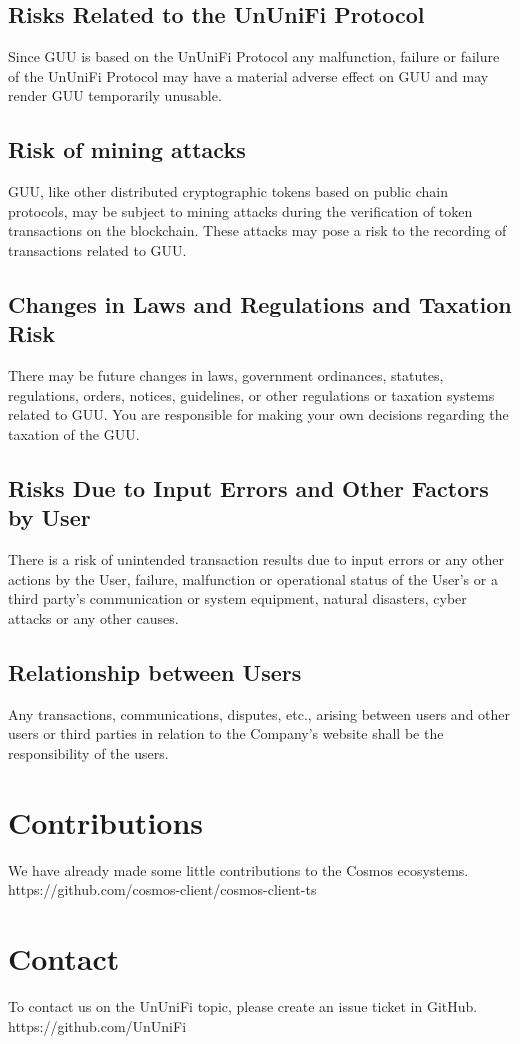 \documentclass[dvipdfmx]{jsarticle}
\begin{document}
\subsection{Risks Related to the UnUniFi Protocol}
Since GUU is based on the UnUniFi Protocol any malfunction, failure or failure of the UnUniFi Protocol may have a material adverse effect on GUU and may render GUU temporarily unusable.

\subsection{Risk of mining attacks}
GUU, like other distributed cryptographic tokens based on public chain protocols, may be subject to mining attacks during the verification of token transactions on the blockchain. 
These attacks may pose a risk to the recording of transactions related to GUU.

\subsection{Changes in Laws and Regulations and Taxation Risk}
There may be future changes in laws, government ordinances, statutes, regulations, orders, notices, guidelines, or other regulations or taxation systems related to GUU. 
You are responsible for making your own decisions regarding the taxation of the GUU. 

\subsection{Risks Due to Input Errors and Other Factors by User}
There is a risk of unintended transaction results due to input errors or any other actions by the User, failure, malfunction or operational status of the User's or a third party's communication or system equipment, natural disasters, cyber attacks or any other causes. 

\subsection{Relationship between Users}
Any transactions, communications, disputes, etc., arising between users and other users or third parties in relation to the Company's website shall be the responsibility of the users. 

\section{Contributions}
We have already made some little contributions to the Cosmos ecosystems. \\
https://github.com/cosmos-client/cosmos-client-ts 

\section{Contact}
To contact us on the UnUniFi topic, please create an issue ticket in GitHub. \\
https://github.com/UnUniFi
\end{document}
